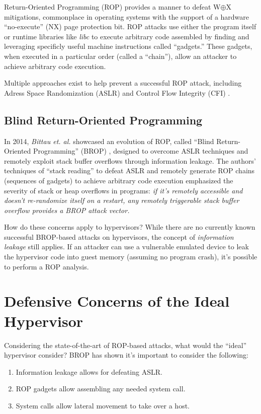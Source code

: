 \documentclass[conference]{IEEEtran}
\begin{document}
Return-Oriented Programming (ROP) \cite{b3} provides a manner to
defeat W$\oplus$X mitigations, commonplace in operating systems with
the support of a hardware ``no-execute'' (NX) page protection bit. ROP
attacks use either the program itself or runtime libraries like
\emph{libc} to execute arbitrary code assembled by finding and
leveraging specificly useful machine instructions called ``gadgets.''
These gadgets, when executed in a particular order (called a
``chain''), allow an attacker to achieve arbitrary code execution.

Multiple approaches exist to help prevent a successful ROP attack,
including Adress Space Randomization (ASLR) and Control Flow Integrity
(CFI) \cite{b4}.

\vspace{3mm}
\subsection{Blind Return-Oriented Programming}
In 2014, \emph{Bittau et. al.} showcased an evolution of ROP, called
``Blind Return-Oriented Programming'' (BROP) \cite{b5}, designed to
overcome ASLR techniques and remotely exploit stack buffer overflows
through information leakage. The authors' techniques of ``stack
reading'' to defeat ASLR and remotely generate ROP chains (sequences
of gadgets) to achieve arbitrary code execution emphasized the
severity of stack or heap overflows in programs: \emph{if it's
remotely accessible and doesn't re-randomize itself on a restart, any
remotely triggerable stack buffer overflow provides a BROP attack
vector.}

How do these concerns apply to hypervisors? While there are no
currently known successful BROP-based attacks on hypervisors, the
concept of \emph{information leakage} still applies. If an attacker
can use a vulnerable emulated device to leak the hypervisor code into
guest memory (assuming no program crash), it's possible to perform a
ROP analysis.

\vspace{5mm}
\section{Defensive Concerns of the Ideal Hypervisor} \label{traits}
Considering the state-of-the-art of ROP-based attacks, what would the
``ideal'' hypervisor consider? BROP has shown it's important to
consider the following:

\vspace{2mm}
\begin{enumerate}
\item Information leakage allows for defeating ASLR.
\item ROP gadgets allow assembling any needed system call.
\item System calls allow lateral movement to take over a host.
\end{enumerate}
\vspace{2mm}
\end{document}
